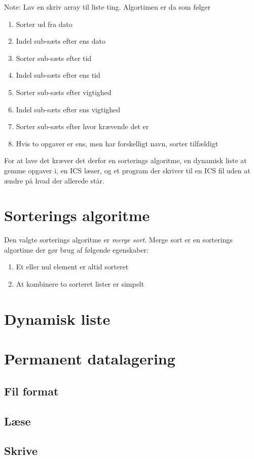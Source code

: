 \documentclass{article}
\begin{document}
Note: Lav en skriv array til liste ting.
\newpage
Algortimen er da som f{\o}lger
\begin{enumerate}
	\item Sorter ud fra dato
	\item Indel sub-s{\ae}ts efter ens dato
	\item Sorter sub-s{\ae}ts efter tid
	\item Indel sub-s{\ae}ts efter ens tid
	\item Sorter sub-s{\ae}ts efter vigtighed
	\item Indel sub-s{\ae}ts efter ens vigtighed
	\item Sorter sub-s{\ae}ts efter hvor kr{\ae}vende det er
	\item Hvis to opgaver er ens, men har forskelligt navn, sorter
		tilf{\ae}ldigt
\end{enumerate}
For at lave det kr{\ae}ver det derfor en sorterings algoritme, en dynamisk liste
at gemme opgaver i, en ICS l{\ae}ser, og et program der skriver til en ICS fil
uden at {\ae}ndre p{\aa} hvad der allerede st{\aa}r.
\section{Sorterings algoritme}
Den valgte sorterings algoritme er \textit{merge sort}. Merge sort er en
sorterings algortime der g{\o}r brug af f{\o}lgende egenskaber:
\begin{enumerate}
	\item Et eller nul element er altid sorteret
	\item At kombinere to sorteret lister er simpelt
\end{enumerate}
\section{Dynamisk liste}
\section{Permanent datalagering}
\subsection{Fil format}
\subsection{L{\ae}se}
\subsection{Skrive}
\end{document}
